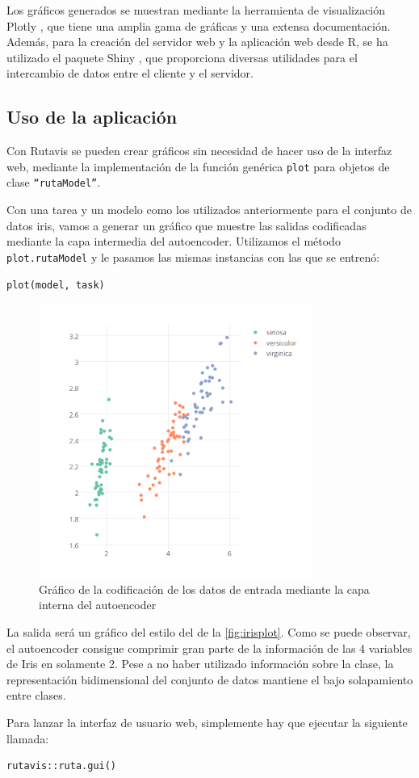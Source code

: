 Los gráficos generados se muestran mediante la herramienta de visualización Plotly \autocite{plotly}, que tiene una amplia gama de gráficas y una extensa documentación. Además, para la creación del servidor web y la aplicación web desde R, se ha utilizado el paquete Shiny \autocite{shiny}, que proporciona diversas utilidades para el intercambio de datos entre el cliente y el servidor.

\subsection{Uso de la aplicación}\label{uso-de-la-aplicaciuxf3n}

Con Rutavis se pueden crear gráficos sin necesidad de hacer uso de la interfaz web, mediante la implementación de la función genérica \texttt{plot} para objetos de clase \texttt{``rutaModel''}.

\begin{example}
  Con una tarea y un modelo como los utilizados anteriormente para el conjunto de datos iris, vamos a generar un gráfico que muestre las salidas codificadas mediante la capa intermedia del autoencoder. Utilizamos el método \texttt{plot.rutaModel} y le pasamos las mismas instancias con las que se entrenó:
\begin{lstlisting}[numbers=none]
plot(model, task)
\end{lstlisting}
\begin{figure}[hbtp]
  \centering
  \includegraphics[width=0.8\textwidth]{images/plot_iris_ae2.png}
  \caption{\label{fig:irisplot}Gráfico de la codificación de los datos de entrada mediante la capa interna del autoencoder}
\end{figure}

La salida será un gráfico del estilo del de la \autoref{fig:irisplot}. 
Como se puede observar, el autoencoder consigue comprimir gran parte de la información de las 4 variables de Iris en solamente 2. Pese a no haber utilizado información sobre la clase, la representación bidimensional del conjunto de datos mantiene el bajo solapamiento entre clases.
\end{example}

Para lanzar la interfaz de usuario web, simplemente hay que ejecutar la siguiente llamada:
\begin{lstlisting}[numbers=none]
rutavis::ruta.gui()
\end{lstlisting}
